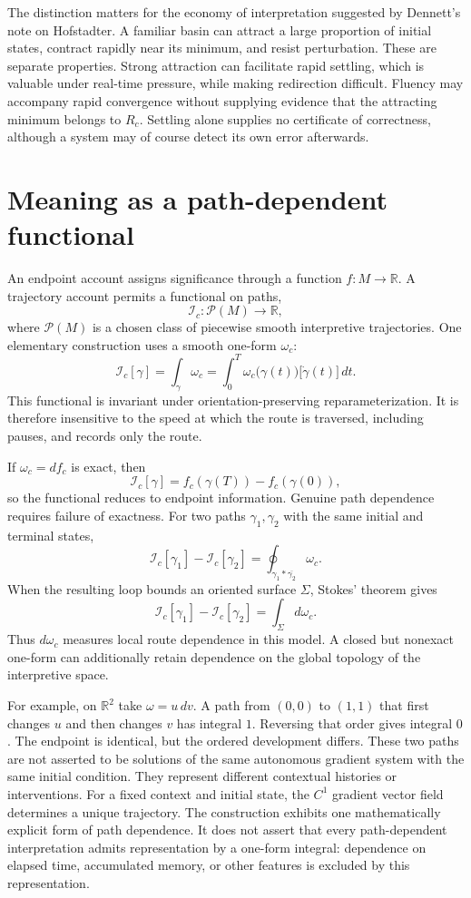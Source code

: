 \documentclass[11pt]{article}
\begin{document}
The distinction matters for the economy of interpretation suggested by Dennett's note on Hofstadter. A familiar basin can attract a large proportion of initial states, contract rapidly near its minimum, and resist perturbation. These are separate properties. Strong attraction can facilitate rapid settling, which is valuable under real-time pressure, while making redirection difficult. Fluency may accompany rapid convergence without supplying evidence that the attracting minimum belongs to $R_c$. Settling alone supplies no certificate of correctness, although a system may of course detect its own error afterwards.

\section{Meaning as a path-dependent functional}

An endpoint account assigns significance through a function $f\colon M\to\mathbb{R}$. A trajectory account permits a functional on paths,
\[
\mathcal{I}_c\colon\mathcal{P}(M)\longrightarrow\mathbb{R},
\]
where $\mathcal{P}(M)$ is a chosen class of piecewise smooth interpretive trajectories. One elementary construction uses a smooth one-form $\omega_c$:
\[
\mathcal{I}_c[\gamma]
=
\int_\gamma\omega_c
=
\int_0^T
\omega_c\bigl(\gamma(t)\bigr)
\bigl[\dot{\gamma}(t)\bigr]\,dt.
\]
This functional is invariant under orientation-preserving reparameterization. It is therefore insensitive to the speed at which the route is traversed, including pauses, and records only the route.

If $\omega_c=df_c$ is exact, then
\[
\mathcal{I}_c[\gamma]
=
f_c(\gamma(T))-f_c(\gamma(0)),
\]
so the functional reduces to endpoint information. Genuine path dependence requires failure of exactness. For two paths $\gamma_1,\gamma_2$ with the same initial and terminal states,
\[
\mathcal{I}_c[\gamma_1]
-
\mathcal{I}_c[\gamma_2]
=
\oint_{\gamma_1*\overline{\gamma_2}}\omega_c.
\]
When the resulting loop bounds an oriented surface $\Sigma$, Stokes' theorem gives
\[
\mathcal{I}_c[\gamma_1]
-
\mathcal{I}_c[\gamma_2]
=
\int_\Sigma d\omega_c.
\]
Thus $d\omega_c$ measures local route dependence in this model. A closed but nonexact one-form can additionally retain dependence on the global topology of the interpretive space.

For example, on $\mathbb{R}^2$ take $\omega=u\,dv$. A path from $(0,0)$ to $(1,1)$ that first changes $u$ and then changes $v$ has integral $1$. Reversing that order gives integral $0$. The endpoint is identical, but the ordered development differs. These two paths are not asserted to be solutions of the same autonomous gradient system with the same initial condition. They represent different contextual histories or interventions. For a fixed context and initial state, the $C^1$ gradient vector field determines a unique trajectory. The construction exhibits one mathematically explicit form of path dependence. It does not assert that every path-dependent interpretation admits representation by a one-form integral: dependence on elapsed time, accumulated memory, or other features is excluded by this representation.
\end{document}
